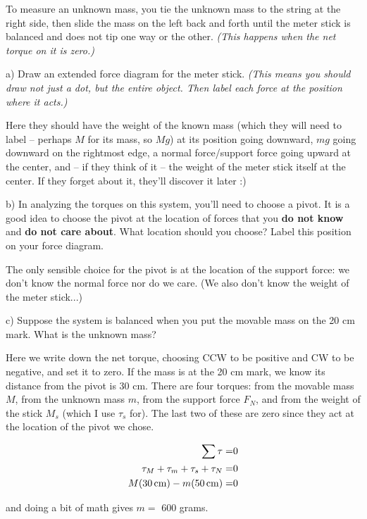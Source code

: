 \documentclass[12pt]{article}
\begin{document}
To measure an unknown mass, you tie the unknown mass to the string at the right side, then slide the mass on the left back and forth until the meter stick is balanced and does not tip one way or the other. \textit{(This happens when the net torque on it is zero.)}



a) Draw an extended force diagram for the meter stick. \textit{(This means you should draw not just a dot, but the entire object. Then label each force at the position where it acts.)}

{\color{red} Here they should have the weight of the known mass (which they will need to label -- perhaps $M$ for its mass, so $Mg$) at its position going downward, $mg$ going downward on the rightmost edge, a normal force/support force going upward at the center, and -- if they think of it -- the weight of the meter stick itself at the center. If they forget about it, they'll discover it later :)}
 
\vspace{3in}

b) In analyzing the torques on this system, you'll need to choose a pivot. It is a good idea to choose the pivot at the location of forces that you {\bf do not know} and {\bf do not care about}. What location should you choose? Label this position on your force diagram.

{\color{red}  The only sensible choice for the pivot is at the location of the support force: we don't know the normal force nor do we care. (We also don't know the weight of the meter stick...) }

\vspace{1in}

\newpage

c) Suppose the system is balanced when you put the movable mass on the 20 cm mark. What is the unknown mass?

{\color{red} Here we write down the net torque, choosing CCW to be positive and CW to be negative, and set it to zero. If the mass is at the 20 cm mark, we know its distance from the pivot is 30 cm. There are four torques: from the movable mass $M$, from the unknown mass $m$, from the support force $F_N$, and from the weight of the stick $M_s$ (which I use $\tau_s$ for). The last two of these are zero since they act at the location of the pivot we chose.
	
	\begin{align*}
		\sum \tau =& 0 \\
		\tau_M + \tau_m + \tau_s + \tau_N =& 0 \\
		M(30\,{\rm cm}) - m(50\,{\rm cm})  =& 0 \\
\end{align*}
	
		and doing a bit of math gives $m = $ 600 grams.
		

  }
\end{document}
